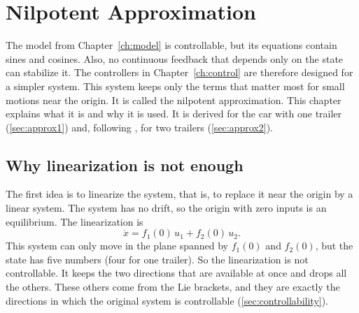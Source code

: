 %

\chapter{Nilpotent Approximation}
\label{ch:nilpotent}

The model from Chapter~\ref{ch:model} is controllable, but its equations
contain sines and cosines. Also, no continuous feedback that depends only on the
state can stabilize it. The controllers in Chapter~\ref{ch:control} are
therefore designed for a simpler system. This system keeps only the terms that
matter most for small motions near the origin. It is called the nilpotent
approximation. This chapter explains what it is and why it is used. It is
derived for the car with one trailer (\cref{sec:approx1}) and, following
\cite{zuyev2024}, for two trailers (\cref{sec:approx2}).

\section{Why linearization is not enough}
\label{sec:linearization}

The first idea is to linearize the system, that is, to replace it near the
origin by a linear system. The system has no drift, so the origin with zero
inputs is an equilibrium. The linearization is
\begin{equation}
  \dot x=f_1(0)\,u_1+f_2(0)\,u_2 .
  \label{eq:linearization}
\end{equation}
This system can only move in the plane spanned by $f_1(0)$ and $f_2(0)$, but the
state has five numbers (four for one trailer). So the linearization is not
controllable. It keeps the two directions that are available at once and drops
all the others. These others come from the Lie brackets, and they are exactly
the directions in which the original system is controllable
(\cref{sec:controllability}).


